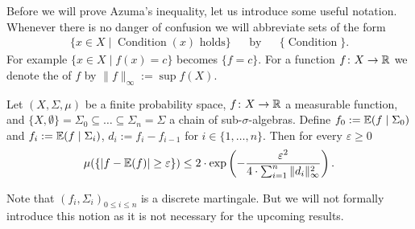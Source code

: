 Before we will prove Azuma's inequality, let us introduce some useful notation. Whenever there is no danger of confusion we will abbreviate sets of the form
\begin{align*}
	\{x\in X\mid \operatorname{Condition}(x)\text{ holds}\} &   & \text{by} &   & \{\operatorname{Condition}\}. 
\end{align*}
For example $\{x\in X\mid f(x)= c\}$ becomes $\{f= c\}$.
For a function $f\colon X\to\mathbb{R}$ we denote the  of $f$ by $\|f\|_\infty:=\sup f(X)$.
		
\begin{lemma}\label{lem:azema}
	Let $(X,\Sigma,\mu)$ be a finite probability space, $f\colon X\to\mathbb{R}$ a measurable function, and $\{X,\emptyset\}=\Sigma_0\subseteq\dots\subseteq\Sigma_n=\Sigma$ a chain of sub-$\sigma$-algebras. Define $f_0:=\mathbb{E}(f\mid\Sigma_0)$ and $f_i:=\mathbb{E}(f\mid\Sigma_i)$, $d_i:=f_i-f_{i-1}$ for $i\in\{1,\dots,n\}$. Then for every $\varepsilon\geq0$
	\[\mu(\{|f-\mathbb{E}(f)|\geq \varepsilon\})\leq 2\cdot\exp\left(-\frac{\varepsilon^2}{4\cdot\sum_{i=1}^{n}\|d_i\|^2_\infty}\right).\]
\end{lemma}
Note that $(f_i,\Sigma_i)_{0\leq i\leq n}$ is a discrete martingale. But we will not formally introduce this notion as it is not necessary for the upcoming results.
		
